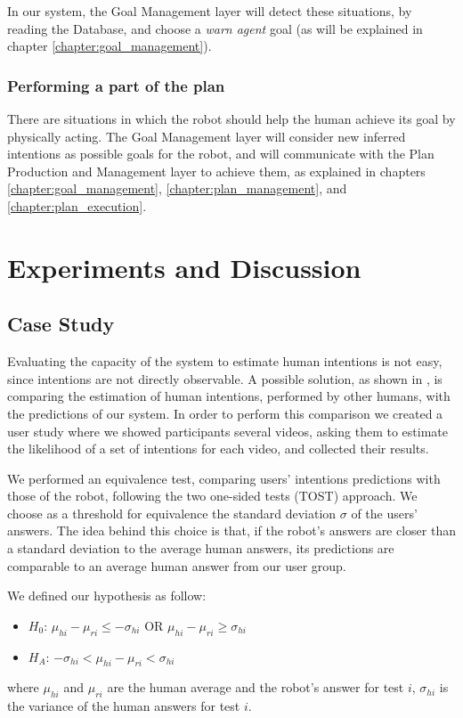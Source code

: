 In our system, the Goal Management layer will detect these situations, by reading the Database, and choose a \textit{warn agent} goal (as will be explained in chapter \ref{chapter:goal_management}).

\subsubsection{Performing a part of the plan}
There are situations in which the robot should help the human achieve its goal by physically acting. The Goal Management layer will consider new inferred intentions as possible goals for the robot, and will communicate with the Plan Production and Management layer to achieve them, as explained in chapters \ref{chapter:goal_management}, \ref{chapter:plan_management}, and \ref{chapter:plan_execution}. 


\section{Experiments and Discussion}
\label{sec:situation_assessment-experiments}
\subsection{Case Study}
Evaluating the capacity of the system to estimate human intentions is not easy, since intentions are not directly observable. A possible solution, as shown in \cite{baker2014modeling}, is comparing the estimation of human intentions, performed by other humans, with the predictions of our system. In order to perform this comparison we created a user study where we showed participants several videos, asking them to estimate the likelihood of a set of intentions for each video, and collected their results. 

We performed an equivalence test, comparing users' intentions predictions with those of the robot, following the two one-sided tests (TOST) approach. We choose as a threshold for equivalence the standard deviation $\sigma$ of the users' answers. The idea behind this choice is that, if the robot's answers are closer than a standard deviation to the average human answers, its predictions are comparable to an average human answer from our user group. 

We defined our hypothesis as follow: 
\begin{itemize}
\item $H_0$: $\mu_{hi}-\mu_{ri}\leq-\sigma_{hi}$ OR $\mu_{hi}-\mu_{ri}\geq\sigma_{hi}$ 
\item $H_A$: $-\sigma_{hi}<\mu_{hi}-\mu_{ri}<\sigma_{hi}$  
\end{itemize}
where $\mu_{hi}$ and $\mu_{ri}$ are the human average and the robot's answer for test $i$, $\sigma_{hi}$ is the variance of the human answers for test $i$.

